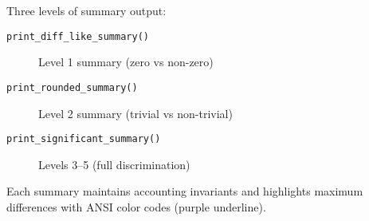 Three levels of summary output:

\begin{description}
    \item[\texttt{print\_diff\_like\_summary()}] Level 1 summary (zero vs non-zero)
    \item[\texttt{print\_rounded\_summary()}] Level 2 summary (trivial vs non-trivial)
    \item[\texttt{print\_significant\_summary()}] Levels 3--5 (full discrimination)
\end{description}

Each summary maintains accounting invariants and highlights maximum differences with ANSI color codes (purple underline).
